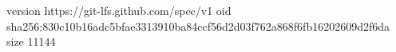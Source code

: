 version https://git-lfs.github.com/spec/v1
oid sha256:830c10b16adc5bfae3313910ba84ccf56d2d03f762a868f6fb16202609d2f6da
size 11144
